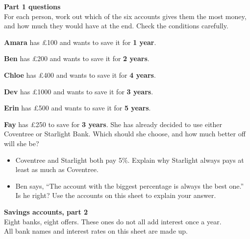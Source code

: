\documentclass[12pt]{article}
\begin{document}
\newpage
\begin{center}
  {\LARGE\bfseries Part 1 questions}\\[1.5mm]
  {\small For each person, work out which of the six accounts gives them the most money,\\
  and how much they would have at the end. Check the conditions carefully.}
\end{center}
\vspace{2mm}

\begin{qlist}
  \item \textbf{Amara} has \pounds100 and wants to save it for \textbf{1 year}.
  \item \textbf{Ben} has \pounds200 and wants to save it for \textbf{2 years}.
  \item \textbf{Chloe} has \pounds400 and wants to save it for \textbf{4 years}.
  \item \textbf{Dev} has \pounds1000 and wants to save it for \textbf{3 years}.
  \item \textbf{Erin} has \pounds500 and wants to save it for \textbf{5 years}.
  \item \textbf{Fay} has \pounds250 to save for \textbf{3 years}. She has already decided to use either
        Coventree or Starlight Bank. Which should she choose, and how much better off will she be?
\end{qlist}

\vfill
\begin{tcolorbox}[enhanced,colback=black!4,colframe=black!45,boxrule=0.8pt,arc=2mm,
                  left=4mm,right=4mm,top=3mm,bottom=3mm,
                  title={Think about},fonttitle=\bfseries,colbacktitle=black!45]
\begin{itemize}[leftmargin=5mm,itemsep=2mm,topsep=1mm,label=\textbullet]
  \item Coventree and Starlight both pay 5\%. Explain why Starlight always pays at least as much as Coventree.
  \item Ben says, ``The account with the biggest percentage is always the best one.'' Is he right? Use the accounts on this sheet to explain your answer.
\end{itemize}
\end{tcolorbox}

\newpage
\begin{center}
  {\LARGE\bfseries Savings accounts, part 2}\\[1.5mm]
  {\small Eight banks, eight offers. These ones do not all add interest once a year.\\
  All bank names and interest rates on this sheet are made up.}
\end{center}
\vspace{2mm}
\end{document}
